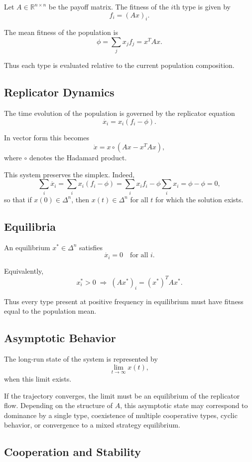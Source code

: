 \documentclass[12pt]{article}
\begin{document}
Let $A \in \mathbb{R}^{n \times n}$ be the payoff matrix. The fitness of the $i$th type is given by
\[
f_i = (Ax)_i .
\]

The mean fitness of the population is
\[
\phi = \sum_j x_j f_j = x^T A x .
\]

Thus each type is evaluated relative to the current population composition.

\subsection{Replicator Dynamics}

The time evolution of the population is governed by the replicator equation
\[
\dot{x_i} = x_i (f_i - \phi) .
\]

In vector form this becomes
\[
\dot{x} = x \circ (Ax - x^T A x) ,
\]
where $\circ$ denotes the Hadamard product.

This system preserves the simplex. Indeed,
\[
\sum_i \dot{x_i}
=
\sum_i x_i(f_i-\phi)
=
\sum_i x_i f_i - \phi \sum_i x_i
=
\phi-\phi
=
0 ,
\]
so that if $x(0)\in \Delta^n$, then $x(t)\in \Delta^n$ for all $t$ for which the solution exists.

\subsection{Equilibria}

An equilibrium $x^* \in \Delta^n$ satisfies
\[
\dot{x_i}=0
\quad\text{for all }i.
\]

Equivalently,
\[
x_i^* > 0 \;\Rightarrow\; (Ax^*)_i = (x^*)^T A x^* .
\]

Thus every type present at positive frequency in equilibrium must have fitness equal to the population mean.

\subsection{Asymptotic Behavior}

The long-run state of the system is represented by
\[
\lim_{t \to \infty} x(t),
\]
when this limit exists.

If the trajectory converges, the limit must be an equilibrium of the replicator flow. Depending on the structure of $A$, this asymptotic state may correspond to dominance by a single type, coexistence of multiple cooperative types, cyclic behavior, or convergence to a mixed strategy equilibrium.

\subsection{Cooperation and Stability}
\end{document}
